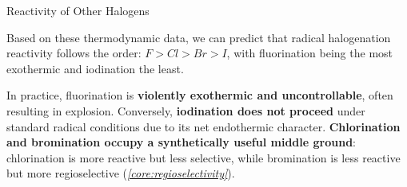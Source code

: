 \documentclass[10pt]{article}
\begin{document}
\begin{core}{Reactivity of Other Halogens}
\begin{itemize}
      \end{itemize}

      Based on these thermodynamic data, we can predict that radical halogenation reactivity follows the order: $F > Cl > Br > I$, with fluorination being the most exothermic and iodination the least.

      In practice, fluorination is \textbf{violently exothermic and uncontrollable}, often resulting in explosion. Conversely, \textbf{iodination does not proceed} under standard radical conditions due to its net endothermic character. \textbf{Chlorination and bromination occupy a synthetically useful middle ground}: chlorination is more reactive but less selective, while bromination is less reactive but more regioselective (\textit{\autoref{core:regioselectivity}}).


    \end{core}
\end{document}
